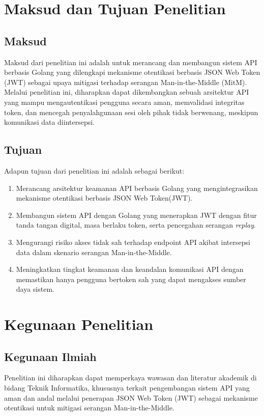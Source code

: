 \section{Maksud dan Tujuan Penelitian}

\subsection{Maksud}
\begin{subsectioncontent}
Maksud dari penelitian ini adalah untuk merancang dan membangun sistem API berbasis Golang yang dilengkapi mekanisme otentikasi berbasis JSON Web Token (JWT) sebagai upaya mitigasi terhadap serangan Man-in-the-Middle (MitM). Melalui penelitian ini, diharapkan dapat dikembangkan sebuah arsitektur API yang mampu mengautentikasi pengguna secara aman, memvalidasi integritas token, dan mencegah penyalahgunaan sesi oleh pihak tidak berwenang, meskipun komunikasi data diintersepsi.
\end{subsectioncontent}

\subsection{Tujuan}
\begin{subsectioncontent}
Adapun tujuan dari penelitian ini adalah sebagai berikut:
\begin{enumerate}[label=\alph*.]
  \item Merancang arsitektur keamanan API berbasis Golang yang mengintegrasikan mekanisme otentikasi berbasis JSON Web Token(JWT).
  \item Membangun sistem API dengan Golang yang menerapkan JWT dengan fitur tanda tangan digital, masa berlaku token, serta pencegahan serangan \textit{replay}.
  \item Mengurangi risiko akses tidak sah terhadap endpoint API akibat intersepsi data dalam skenario serangan Man-in-the-Middle.
  \item Meningkatkan tingkat keamanan dan keandalan komunikasi API dengan memastikan hanya pengguna bertoken sah yang dapat mengakses sumber daya sistem.
\end{enumerate}
\end{subsectioncontent}
\section{Kegunaan Penelitian}

\subsection{Kegunaan Ilmiah}
\begin{subsectioncontent}
Penelitian ini diharapkan dapat memperkaya wawasan dan literatur akademik di bidang Teknik Informatika, khususnya terkait pengembangan sistem API yang aman dan andal melalui penerapan JSON Web Token (JWT) sebagai mekanisme otentikasi untuk mitigasi serangan Man-in-the-Middle.
\end{subsectioncontent}
